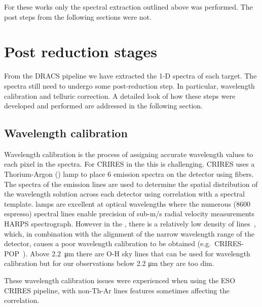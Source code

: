 For these works only the spectral extraction outlined above was performed. The post  steps from the following sections were not.


\section{Post reduction stages}
\label{sec:posreduction}
From the DRACS pipeline we have extracted the 1-D spectra of each target. The spectra still need to undergo some post-reduction step. In particular, wavelength calibration and telluric correction. A detailed look of how these steps were developed and performed are addressed in the following section.

\subsection{Wavelength calibration}
\label{subsec:wavecalib}
Wavelength calibration is the process of assigning accurate wavelength values to each pixel in the spectra. For CRIRES in the {\nir} this is challenging. CRIRES uses a Thorium-Argon (\thar) lamp to place 6 emission spectra on the detector using fibers. The spectra of the {\thar} emission lines are used to determine the spatial distribution of the wavelength solution across each detector using correlation with a spectral template.  lamps are excellent at optical wavelengths where the numerous (8600 espresso) spectral lines enable precision of sub-m/s radial velocity measurements HARPS spectrograph. However in the {\nir}, there is a relatively low density of {\thar} lines~\citep{kerber_laboratory_2009}, which, in combination with the alignment of the narrow wavelength range of the detector, causes a poor wavelength calibration to be obtained (e.g.\ CRIRES-POP~\citep{nicholls_crirespop_2017}).
Above 2.2~\si{\micro\meter} there are {O-H} sky lines that can be used for wavelength calibration but for our observations below 2.2 \si{\micro\meter} they are too dim.

These wavelength calibration issues were experienced when using the ESO CRIRES pipeline, with non-Th-Ar lines features sometimes affecting the correlation.

